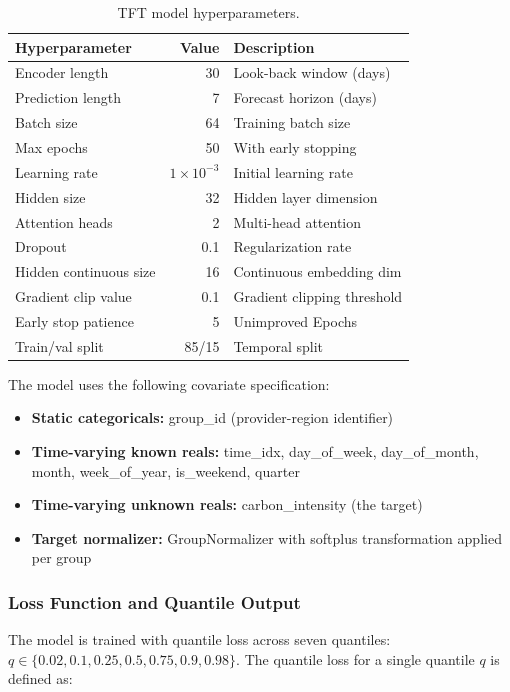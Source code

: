 \documentclass[12pt]{article}
\begin{document}
\begin{table}[htbp]
\centering
\caption{TFT model hyperparameters.}
\label{tab:hyperparams}
\small
\begin{tabular}{lrl}
\toprule
\textbf{Hyperparameter} & \textbf{Value} & \textbf{Description} \\
\midrule
Encoder length & 30 & Look-back window (days) \\
Prediction length & 7 & Forecast horizon (days) \\
Batch size & 64 & Training batch size \\
Max epochs & 50 & With early stopping \\
Learning rate & $1 \times 10^{-3}$ & Initial learning rate \\
Hidden size & 32 & Hidden layer dimension \\
Attention heads & 2 & Multi-head attention \\
Dropout & 0.1 & Regularization rate \\
Hidden continuous size & 16 & Continuous embedding dim \\
Gradient clip value & 0.1 & Gradient clipping threshold \\
Early stop patience & 5 & Unimproved Epochs \\
Train/val split & 85/15 & Temporal split \\
\bottomrule
\end{tabular}
\end{table}

The model uses the following covariate specification:
\begin{itemize}
    \item \textbf{Static categoricals:} group\_id (provider-region identifier)
    \item \textbf{Time-varying known reals:} time\_idx, day\_of\_week, day\_of\_month, month, week\_of\_year, is\_weekend, quarter
    \item \textbf{Time-varying unknown reals:} carbon\_intensity (the target)
    \item \textbf{Target normalizer:} GroupNormalizer with softplus transformation applied per group
\end{itemize}

\subsubsection{Loss Function and Quantile Output}

The model is trained with quantile loss across seven quantiles: $q \in \{0.02, 0.1, 0.25, 0.5, 0.75, 0.9, 0.98\}$. The quantile loss for a single quantile $q$ is defined as:
\end{document}
